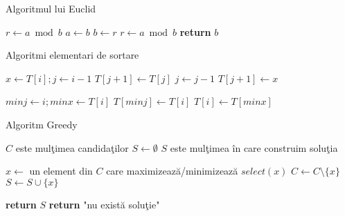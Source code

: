\documentclass{article}
\begin{document}
\begin{algorithm}
\caption{Algoritmul lui Euclid}\label{euclid}
\begin{algorithmic}[1]
\State $r\gets a\bmod b$
\State $a\gets b$
\State $b\gets r$
\State $r\gets a\bmod b$
\EndWhile\label{euclidendwhile}
\State \textbf{return} $b$
\EndProcedure
\end{algorithmic}
\end{algorithm}

\begin{algorithm}
\caption{Algoritmi elementari de sortare}\label{sortare}
\begin{algorithmic}[1]
		\State $x \gets T[i]; j \gets i-1$
			\State $T[j+1] \gets T[j]$
			\State $j \gets j-1$
		\EndWhile
		\State $T[j+1] \gets x$
	\EndFor
\EndProcedure

		\State $minj \gets i; minx \gets T[i]$
			\EndIf
		\EndFor
		\State $T[minj] \gets T[i]$
		\State $T[i] \gets T[minx]$
	\EndFor
\EndProcedure
\end{algorithmic}
\end{algorithm}

\begin{algorithm}
\caption{Algoritm Greedy}\label{greedy}
\begin{algorithmic}[1]
	\State \Comment $C$ este mulţimea candidaţilor
	\State $S \gets \emptyset$ \Comment $S$ este mulţimea în care construim soluţia

		\State $x \gets$ un element din $C$ care maximizează/minimizează $select(x)$
		\State $C \gets C \setminus \{x\}$
			\State $S \gets S \cup \{x\}$
		\EndIf
	\EndWhile

		\State \textbf{return} $S$	
	\Else
		\State \textbf{return} "nu există soluţie"
	\EndIf
\EndProcedure
\end{algorithmic}
\end{algorithm}
\end{document}

